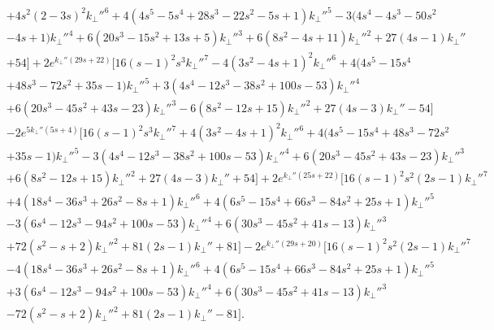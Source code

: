 \documentclass{jfm}
\begin{document}
\begin{align}
&+4 s^2 (2-3 s)^2 k_\perp''^6+4 (4 s^5-5 s^4+28 s^3-22 s^2-5 s+1) k_\perp''^5-3 (4 s^4-4 s^3-50 s^2\nonumber\\
&-4 s+1) k_\perp''^4+6 (20 s^3-15 s^2+13 s+5) k_\perp''^3+6 (8 s^2-4 s+11) k_\perp''^2+27 (4 s-1) k_\perp''\nonumber\\
&+54\big]+2 e^{k_\perp'' (29 s+22)} \big[16 (s-1)^2 s^3 k_\perp''^7-4 (3 s^2-4 s+1)^2 k_\perp''^6+4 (4 s^5-15 s^4\nonumber\\
&+48 s^3-72 s^2+35 s-1) k_\perp''^5+3 (4 s^4-12 s^3-38 s^2+100 s-53) k_\perp''^4\nonumber\\
&+6 (20 s^3-45 s^2+43 s-23) k_\perp''^3-6 (8 s^2-12 s+15) k_\perp''^2+27 (4 s-3) k_\perp''-54\big]\nonumber\\
&-2 e^{5 k_\perp'' (5 s+4)} \big[16 (s-1)^2 s^3 k_\perp''^7+4 (3 s^2-4 s+1)^2 k_\perp''^6+4 (4 s^5-15 s^4+48 s^3-72 s^2\nonumber\\
&+35 s-1) k_\perp''^5-3 (4 s^4-12 s^3-38 s^2+100 s-53) k_\perp''^4+6 (20 s^3-45 s^2+43 s-23) k_\perp''^3\nonumber\\
&+6 (8 s^2-12 s+15) k_\perp''^2+27 (4 s-3) k_\perp''+54\big]+2 e^{k_\perp'' (25 s+22)} \big[16 (s-1)^2 s^2 (2 s-1) k_\perp''^7\nonumber\\
&+4 (18 s^4-36 s^3+26 s^2-8 s+1) k_\perp''^6+4 (6 s^5-15 s^4+66 s^3-84 s^2+25 s+1) k_\perp''^5\nonumber\\
&-3 (6 s^4-12 s^3-94 s^2+100 s-53) k_\perp''^4+6 (30 s^3-45 s^2+41 s-13) k_\perp''^3\nonumber\\
&+72 (s^2-s+2) k_\perp''^2+81 (2 s-1) k_\perp''+81\big]-2 e^{k_\perp'' (29 s+20)} \big[16 (s-1)^2 s^2 (2 s-1) k_\perp''^7\nonumber\\
&-4 (18 s^4-36 s^3+26 s^2-8 s+1) k_\perp''^6+4 (6 s^5-15 s^4+66 s^3-84 s^2+25 s+1) k_\perp''^5\nonumber\\
&+3 (6 s^4-12 s^3-94 s^2+100 s-53) k_\perp''^4+6 (30 s^3-45 s^2+41 s-13) k_\perp''^3\nonumber\\
&-72 (s^2-s+2) k_\perp''^2+81 (2 s-1) k_\perp''-81\big].
\end{align}
\end{document}
